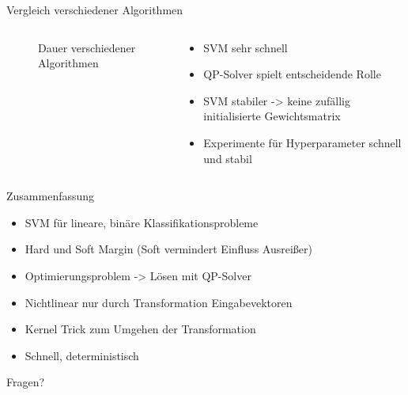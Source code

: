 \documentclass[ngerman]{beamer}
\begin{document}
\begin{frame}{Vergleich verschiedener Algorithmen}
\begin{columns}
\begin{column}{0.4\textwidth}
\begin{figure}
                \caption{Dauer verschiedener Algorithmen}
                \label{fig:daueralgos}
            \end{figure}
        \end{column} \pause
        \begin{column}{0.6\textwidth}
            \begin{itemize}
                \item SVM sehr schnell \pause
                \item QP-Solver spielt entscheidende Rolle \pause
                \item SVM stabiler -> keine zufällig initialisierte Gewichtsmatrix \pause
                \item Experimente für Hyperparameter schnell und stabil
            \end{itemize}
        \end{column}
    \end{columns}
\end{frame}

\begin{frame}{Zusammenfassung}
    \centering
    \begin{itemize}
        \item SVM für lineare, binäre Klassifikationsprobleme \pause
        \item Hard und Soft Margin (Soft vermindert Einfluss Ausreißer) \pause
        \item Optimierungsproblem -> Lösen mit QP-Solver \pause
        \item Nichtlinear nur durch Transformation Eingabevektoren \pause
        \item Kernel Trick zum Umgehen der Transformation \pause
        \item Schnell, deterministisch
    \end{itemize}

\end{frame}

\begin{frame}[standout]
	Fragen?
\end{frame}
\end{document}
